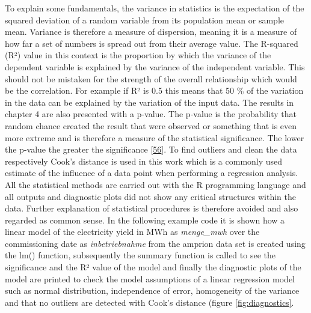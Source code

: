 \documentclass[a4paper,11pt]{article}
\begin{document}
To explain some fundamentals, the variance in statistics is the expectation of the squared deviation of a random variable from its population mean or sample mean. Variance is therefore a measure of dispersion, meaning it is a measure of how far a set of numbers is spread out from their average value. The R-squared (R²) value in this context is the proportion by which the variance of the dependent variable is explained by the variance of the independent variable. This should not be mistaken for the strength of the overall relationship which would be the correlation. For example if R² is 0.5 this means that 50 \% of the variation in the data can be explained by the variation of the input data. The results in chapter 4 are also presented with a p-value. The p-value is the probability that random chance created the result that were observed or something that is even more extreme and is therefore a measure of the statistical significance. The lower the p-value the greater the significance {[}\protect\hyperlink{ref-LeoH.Kahane.2006}{56}{]}. To find outliers and clean the data respectively Cook's distance is used in this work which is a commonly used estimate of the influence of a data point when performing a regression analysis. All the statistical methods are carried out with the R programming language and all outputs and diagnostic plots did not show any critical structures within the data. Further explanation of statistical procedures is therefore avoided and also regarded as common sense. In the following example code it is shown how a linear model of the electricity yield in MWh as \emph{menge\_mwh} over the commissioning date as \emph{inbetriebnahme} from the amprion data set is created using the lm() function, subsequently the summary function is called to see the significance and the R² value of the model and finally the diagnostic plots of the model are printed to check the model assumptions of a linear regression model such as normal distribution, independence of error, homogeneity of the variance and that no outliers are detected with Cook's distance (figure \ref{fig:diagnostics}.
\end{document}
